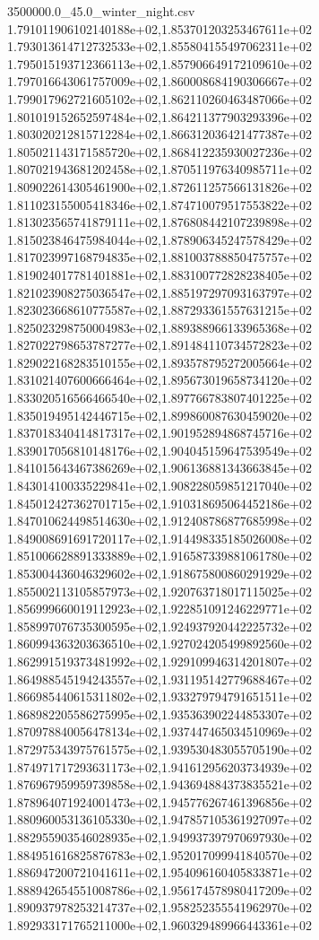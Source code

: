 \begin{filecontents*}{3500000.0_45.0_winter_night.csv}
1.791011906102140188e+02,1.853701203253467611e+02
1.793013614712732533e+02,1.855804155497062311e+02
1.795015193712366113e+02,1.857906649172109610e+02
1.797016643061757009e+02,1.860008684190306667e+02
1.799017962721605102e+02,1.862110260463487066e+02
1.801019152652597484e+02,1.864211377903293396e+02
1.803020212815712284e+02,1.866312036421477387e+02
1.805021143171585720e+02,1.868412235930027236e+02
1.807021943681202458e+02,1.870511976340985711e+02
1.809022614305461900e+02,1.872611257566131826e+02
1.811023155005418346e+02,1.874710079517553822e+02
1.813023565741879111e+02,1.876808442107239898e+02
1.815023846475984044e+02,1.878906345247578429e+02
1.817023997168794835e+02,1.881003788850475757e+02
1.819024017781401881e+02,1.883100772828238405e+02
1.821023908275036547e+02,1.885197297093163797e+02
1.823023668610775587e+02,1.887293361557631215e+02
1.825023298750004983e+02,1.889388966133965368e+02
1.827022798653787277e+02,1.891484110734572823e+02
1.829022168283510155e+02,1.893578795272005664e+02
1.831021407600666464e+02,1.895673019658734120e+02
1.833020516566466540e+02,1.897766783807401225e+02
1.835019495142446715e+02,1.899860087630459020e+02
1.837018340414817317e+02,1.901952894868745716e+02
1.839017056810148176e+02,1.904045159647539549e+02
1.841015643467386269e+02,1.906136881343663845e+02
1.843014100335229841e+02,1.908228059851217040e+02
1.845012427362701715e+02,1.910318695064452186e+02
1.847010624498514630e+02,1.912408786877685998e+02
1.849008691691720117e+02,1.914498335185026008e+02
1.851006628891333889e+02,1.916587339881061780e+02
1.853004436046329602e+02,1.918675800860291929e+02
1.855002113105857973e+02,1.920763718017115025e+02
1.856999660019112923e+02,1.922851091246229771e+02
1.858997076735300595e+02,1.924937920442225732e+02
1.860994363203636510e+02,1.927024205499892560e+02
1.862991519373481992e+02,1.929109946314201807e+02
1.864988545194243557e+02,1.931195142779688467e+02
1.866985440615311802e+02,1.933279794791651511e+02
1.868982205586275995e+02,1.935363902244853307e+02
1.870978840056478134e+02,1.937447465034510969e+02
1.872975343975761575e+02,1.939530483055705190e+02
1.874971717293631173e+02,1.941612956203734939e+02
1.876967959959739858e+02,1.943694884373835521e+02
1.878964071924001473e+02,1.945776267461396856e+02
1.880960053136105330e+02,1.947857105361927097e+02
1.882955903546028935e+02,1.949937397970697930e+02
1.884951616825876783e+02,1.952017099941840570e+02
1.886947200721041611e+02,1.954096160405833871e+02
1.888942654551008786e+02,1.956174578980417209e+02
1.890937978253214737e+02,1.958252355541962970e+02
1.892933171765211000e+02,1.960329489966443361e+02

\end{filecontents*}
